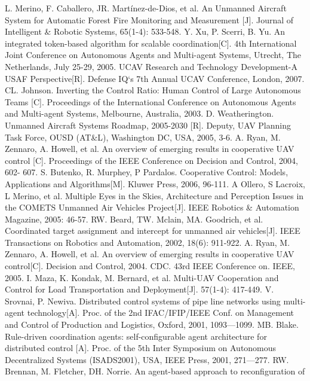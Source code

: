 \documentclass{mcmthesis}
\begin{document}
\begin{thebibliography}{99}
\bibitem L. Merino, F. Caballero, JR. Martínez-de-Dios, et al. An Unmanned Aircraft System for
Automatic Forest Fire Monitoring and Measurement [J]. Journal of Intelligent \& Robotic
Systems, 65(1-4): 533-548.
\bibitem Y. Xu, P. Scerri, B. Yu. An integrated token-based algorithm for scalable coordination[C].
4th International Joint Conference on Autonomous Agents and Multi-agent Systems, Utrecht,
The Netherlands, July 25-29, 2005.
\bibitem UCAV Research and Technology Development-A USAF Perspective[R]. Defense IQ`s 7th
Annual UCAV Conference, London, 2007.
\bibitem CL. Johnson. Inverting the Control Ratio: Human Control of Large Autonomous Teams
[C]. Proceedings of the International Conference on Autonomous Agents and Multi-agent
Systems, Melbourne, Australia, 2003.
\bibitem D. Weatherington. Unmanned Aircraft Systems Roadmap, 2005-2030 [R]. Deputy, UAV
Planning Task Force, OUSD (AT\&L), Washington DC, USA, 2005, 3-6.
\bibitem A. Ryan, M. Zennaro, A. Howell, et al. An overview of emerging results in cooperative
UAV control [C]. Proceedings of the IEEE Conference on Decision and Control, 2004, 602-
607.
\bibitem S. Butenko, R. Murphey, P Pardalos. Cooperative Control: Models, Applications and
Algorithms[M]. Kluwer Press, 2006, 96-111.
\bibitem A Ollero, S Lacroix, L Merino, et al. Multiple Eyes in the Skies, Architecture and
Perception Issues in the COMETS Unmanned Air Vehicles Project[J]. IEEE Robotics \&
Automation Magazine, 2005: 46-57.
\bibitem RW. Beard, TW. Mclain, MA. Goodrich, et al. Coordinated target assignment and intercept
for unmanned air vehicles[J]. IEEE Transactions on Robotics and Automation, 2002, 18(6):
911-922.
\bibitem A. Ryan, M. Zennaro, A. Howell, et al. An overview of emerging results in cooperative
UAV control[C]. Decision and Control, 2004. CDC. 43rd IEEE Conference on. IEEE, 2005.
\bibitem I. Maza, K. Kondak, M. Bernard, et al. Multi-UAV Cooperation and Control for Load
Transportation and Deployment[J]. 57(1-4): 417-449.
\bibitem V. Srovnai, P. Newiva. Distributed control systems of pipe line networks using multi-agent
technology[A]. Proc. of the 2nd IFAC/IFIP/IEEE Conf. on Management and Control of
Production and Logistics, Oxford, 2001, 1093—1099.
\bibitem MB. Blake. Rule-driven coordination agents: self-configurable agent architecture for
distributed control [A]. Proc. of the 5th Inter Symposium on Autonomous Decentralized
Systems (ISADS2001), USA, IEEE Press, 2001, 271—277.
\bibitem RW. Brennan, M. Fletcher, DH. Norrie. An agent-based approach to reconfiguration of

\end{thebibliography}
\end{document}
